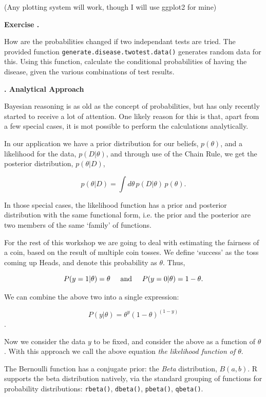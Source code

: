 \documentclass[10pt, a4paper]{article}
\newcounter{wssection}
\newcounter{wsexercise}[wssection]
\newcommand{\worksheetsection}[1]{
\vspace{10mm}
\stepcounter{wssection}
\noindent \Large \textbf{\thewssection. #1} \normalsize
\vspace{3mm}
}
\newcommand{\worksheetexercise}{
\stepcounter{wsexercise}
\vspace{5mm} \noindent \textbf{Exercise \thewssection.\thewsexercise \;}
}
\begin{document}
(Any plotting system will work, though I will use ggplot2 for mine)


\worksheetexercise
How are the probabilities changed if two independant tests are
tried. The provided function \texttt{generate.disease.twotest.data()}
generates random data for this. Using this function, calculate the
conditional probabilities of having the disease, given the various
combinations of test results.



\worksheetsection{Analytical Approach}

\noindent
Bayesian reasoning is as old as the concept of probabilities, but has
only recently started to receive a lot of attention. One likely reason
for this is that, apart from a few special cases, it is mot possible
to perform the calculations analytically.

In our application we have a prior distribution for our beliefs,
$p(\theta)$, and a likelihood for the data, $p(D | \theta)$, and
through use of the Chain Rule, we get the posterior distribution,
$p(\theta | D)$,

\[ p(\theta | D) = \int d\theta \, p(D | \theta) \, p(\theta).  \]

In those special cases, the likelihood function has a prior and
posterior distribution with the same functional form, i.e. the prior
and the posterior are two members of the same `family' of functions.

For the rest of this workshop we are going to deal with estimating the
fairness of a coin, based on the result of multiple coin tosses. We
define `success' as the toss coming up Heads, and denote this
probability as $\theta$. Thus,

\[ P(y = 1 | \theta) = \theta \hspace{5mm} \text{and} \hspace{5mm}
   P(y = 0 | \theta) = 1 - \theta. \]

\noindent
We can combine the above two into a single expression:

\[ P(y | \theta) = \theta^y (1 - \theta)^{(1 - y)} \].

Now we consider the data $y$ to be fixed, and consider the above as a
function of $\theta$. With this approach we call the above equation
\emph{the likelihood function of $\theta$}.

The Bernoulli function has a conjugate prior: the \emph{Beta}
distribution, $B(a, b)$. R supports the beta distribution natively,
via the standard grouping of functions for probability distributions:
\texttt{rbeta()}, \texttt{dbeta()}, \texttt{pbeta()}, \texttt{qbeta()}.
\end{document}

